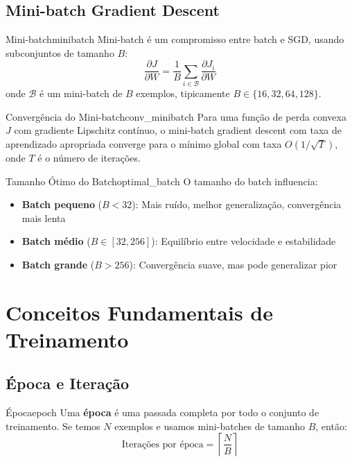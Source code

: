 \documentclass[a4paper,12pt]{article}
\newcommand{\grad}[2]{\frac{\partial #1}{\partial #2}}
\begin{document}
\subsection{Mini-batch Gradient Descent}

\begin{definicao}{Mini-batch}{minibatch}
Mini-batch é um compromisso entre batch e SGD, usando subconjuntos de tamanho $B$:
\[
\grad{J}{W} = \frac{1}{B} \sum_{i \in \mathcal{B}} \grad{J_i}{W}
\]
onde $\mathcal{B}$ é um mini-batch de $B$ exemplos, tipicamente $B \in \{16, 32, 64, 128\}$.
\end{definicao}

\begin{teorema}{Convergência do Mini-batch}{conv_minibatch}
Para uma função de perda convexa $J$ com gradiente Lipschitz contínuo, o mini-batch gradient descent com taxa de aprendizado apropriada converge para o mínimo global com taxa $O(1/\sqrt{T})$, onde $T$ é o número de iterações.
\end{teorema}

\begin{observacao}{Tamanho Ótimo do Batch}{optimal_batch}
O tamanho do batch influencia:
\begin{itemize}
    \item \textbf{Batch pequeno} ($B < 32$): Mais ruído, melhor generalização, convergência mais lenta
    \item \textbf{Batch médio} ($B \in [32, 256]$): Equilíbrio entre velocidade e estabilidade
    \item \textbf{Batch grande} ($B > 256$): Convergência suave, mas pode generalizar pior
\end{itemize}
\end{observacao}

\section{Conceitos Fundamentais de Treinamento}

\subsection{Época e Iteração}

\begin{definicao}{Época}{epoch}
Uma \textbf{época} é uma passada completa por todo o conjunto de treinamento. Se temos $N$ exemplos e usamos mini-batches de tamanho $B$, então:
\[
\text{Iterações por época} = \left\lceil \frac{N}{B} \right\rceil
\]
\end{definicao}
\end{document}
